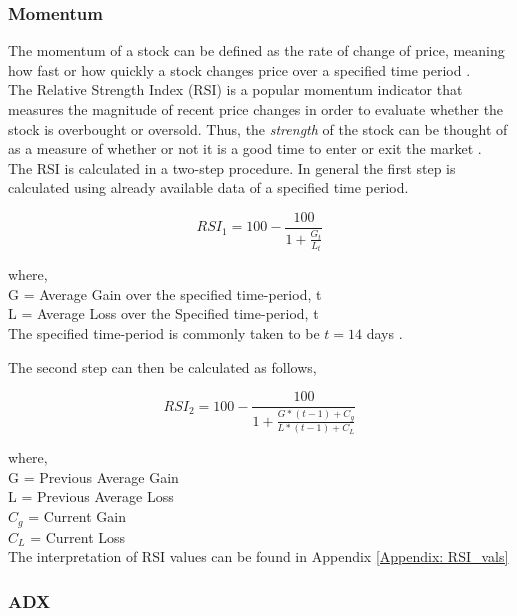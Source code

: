 \subsubsection{Momentum}

\noindent The momentum of a stock can be defined as the rate of change of price, meaning how fast or how quickly a stock changes price over a specified time period \cite{??}. \\

\noindent The Relative Strength Index (RSI) is a popular momentum indicator that measures the magnitude of recent price changes in order to evaluate whether the stock is overbought or oversold. Thus, the \textit{strength} of the stock can be thought of as a measure of whether or not it is a good time to enter or exit the market \cite{??}. \\

\noindent The RSI is calculated in a two-step procedure. In general the first step is calculated using already available data of a specified time period\cite{??}.


\begin{equation}
    RSI_1 = 100- \frac{100}{1+ \frac{G_{t}}{L_{t}}}
\end{equation}

\noindent where, \\
G = Average Gain over the specified time-period, t \\
L = Average Loss over the Specified time-period, t \\

\noindent The specified time-period is commonly taken to be $t=14$ days \cite{??}.

\noindent The second step can then be calculated as follows,

\begin{equation}
    RSI_2 = 100 - \frac{100}{1+ \frac{G*(t-1) + C_g}{L*(t-1) + C_L}}
\end{equation}

\noindent where, \\
G = Previous Average Gain  \\
L = Previous Average Loss \\
$C_g$ = Current Gain \\
$C_L$ = Current Loss \\

\noindent The interpretation of RSI values can be found in Appendix \ref{Appendix: RSI_vals}


\subsubsection{ADX}

